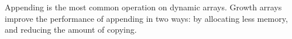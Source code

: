 \descriptn

Appending is the most common operation on dynamic arrays. Growth arrays improve the performance of appending in two ways: by allocating less memory, and reducing the amount of copying.